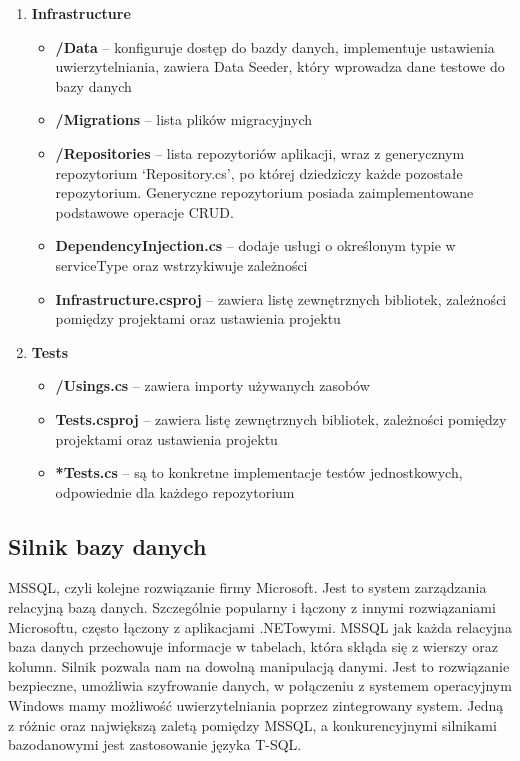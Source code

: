 \documentclass[a4paper,twoside,12pt]{book}
\begin{document}
\begin{enumerate}
    \item \textbf{Infrastructure} \begin{itemize}
        \item \textbf{/Data} -- konfiguruje dostęp do bazdy danych, implementuje ustawienia uwierzytelniania, zawiera Data Seeder, który wprowadza dane testowe do bazy danych 
        \item \textbf{/Migrations} -- lista plików migracyjnych 
        \item \textbf{/Repositories} -- lista repozytoriów aplikacji, wraz z generycznym repozytorium ‘Repository.cs’, po której dziedziczy każde pozostałe repozytorium. Generyczne repozytorium posiada zaimplementowane podstawowe operacje CRUD. 
        \item \textbf{DependencyInjection.cs} -- dodaje usługi o określonym typie w serviceType oraz wstrzykiwuje zależności 
        \item \textbf{Infrastructure.csproj} -- zawiera listę zewnętrznych bibliotek, zależności pomiędzy projektami oraz ustawienia projektu 
    \end{itemize}

    \item \textbf{Tests} \begin{itemize}
        \item \textbf{/Usings.cs} -- zawiera importy używanych zasobów 
        \item \textbf{Tests.csproj} -- zawiera listę zewnętrznych bibliotek, zależności pomiędzy projektami oraz ustawienia projektu 
        \item \textbf{*Tests.cs} -- są to konkretne implementacje testów jednostkowych, odpowiednie dla każdego repozytorium 
    \end{itemize}
\end{enumerate}

\subsection{Silnik bazy danych}
MSSQL, czyli kolejne rozwiązanie firmy Microsoft. Jest to system zarządzania relacyjną bazą danych. Szczególnie popularny i łączony z innymi rozwiązaniami Microsoftu, często łączony z aplikacjami .NETowymi. MSSQL jak każda relacyjna baza danych przechowuje informacje w tabelach, która skłąda się z wierszy oraz kolumn. Silnik pozwala nam na dowolną manipulacją danymi. Jest to rozwiązanie bezpieczne, umożliwia szyfrowanie danych, w połączeniu z systemem operacyjnym Windows mamy możliwość uwierzytelniania poprzez zintegrowany system. Jedną z różnic oraz największą zaletą pomiędzy MSSQL, a konkurencyjnymi silnikami bazodanowymi jest zastosowanie języka T-SQL. 
\end{document}
